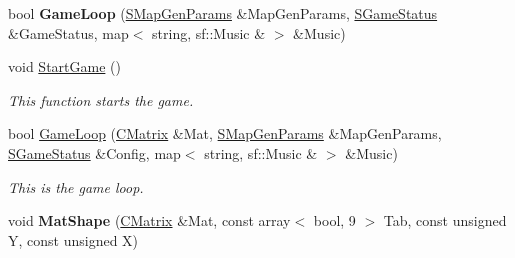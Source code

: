 \begin{DoxyCompactItemize}
\item 
\hypertarget{namespace_chase_game_a1ca6f3f9092b35d9bea0343fd032d7f0}{bool {\bfseries Game\-Loop} (\hyperlink{struct_chase_game_1_1_s_map_gen_params}{S\-Map\-Gen\-Params} \&Map\-Gen\-Params, \hyperlink{struct_chase_game_1_1_s_game_status}{S\-Game\-Status} \&Game\-Status, map$<$ string, sf\-::\-Music \& $>$ \&Music)}\label{namespace_chase_game_a1ca6f3f9092b35d9bea0343fd032d7f0}

\item 
\hypertarget{namespace_chase_game_a528073d13296b3cf84a6ae07c3550e74}{void \hyperlink{namespace_chase_game_a528073d13296b3cf84a6ae07c3550e74}{Start\-Game} ()}\label{namespace_chase_game_a528073d13296b3cf84a6ae07c3550e74}

\begin{DoxyCompactList}\small\item\em This function starts the game. \end{DoxyCompactList}\item 
bool \hyperlink{namespace_chase_game_a978204f0ec269a6fa5f43bb523d84e57}{Game\-Loop} (\hyperlink{namespace_chase_game_a469449f9237e59efce3982127366c550}{C\-Matrix} \&Mat, \hyperlink{struct_chase_game_1_1_s_map_gen_params}{S\-Map\-Gen\-Params} \&Map\-Gen\-Params, \hyperlink{struct_chase_game_1_1_s_game_status}{S\-Game\-Status} \&Config, map$<$ string, sf\-::\-Music \& $>$ \&Music)
\begin{DoxyCompactList}\small\item\em This is the game loop. \end{DoxyCompactList}\item 
\hypertarget{namespace_chase_game_ac12626138d0e2c49669eba73ffb4e4b7}{void {\bfseries Mat\-Shape} (\hyperlink{namespace_chase_game_a469449f9237e59efce3982127366c550}{C\-Matrix} \&Mat, const array$<$ bool, 9 $>$ Tab, const unsigned Y, const unsigned X)}\label{namespace_chase_game_ac12626138d0e2c49669eba73ffb4e4b7}


\end{DoxyCompactItemize}

